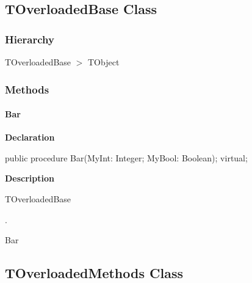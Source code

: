 \documentclass{report}
\newif\ifpdf
\begin{document}
\subsection*{TOverloadedBase Class}
\fi
\label{ok_link_tag_overloads.TOverloadedBase}
\subsubsection*{\large{\textbf{Hierarchy}}\normalsize\hspace{1ex}\hfill}
TOverloadedBase {$>$} TObject
\subsubsection*{\large{\textbf{Methods}}\normalsize\hspace{1ex}\hfill}
\paragraph*{Bar}\hspace*{\fill}

\label{ok_link_tag_overloads.TOverloadedBase-Bar}
\begin{list}{}{
\setlength{\itemindent}{0cm}
\setlength{\listparindent}{0cm}
\setlength{\leftmargin}{\evensidemargin}
\addtolength{\leftmargin}{\tmplength}
\settowidth{\labelsep}{X}
\addtolength{\leftmargin}{\labelsep}
\setlength{\labelwidth}{\tmplength}
}
\item[\textbf{Declaration}\hfill]
\ifpdf
\begin{flushleft}
\fi
\begin{ttfamily}
public procedure Bar(MyInt: Integer; MyBool: Boolean); virtual;\end{ttfamily}

\ifpdf
\end{flushleft}
\fi

\par
\item[\textbf{Description}]
\begin{ttfamily}TOverloadedBase\end{ttfamily}.\begin{ttfamily}Bar\end{ttfamily}

\end{list}
\ifpdf
\subsection*{\large{\textbf{TOverloadedMethods Class}}\normalsize\hspace{1ex}\hrulefill}
\else
\end{document}
